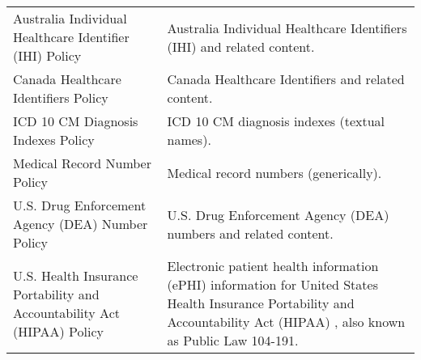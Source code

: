 \documentclass[letterpaper,10pt,english]{sphinxmanual}
\begin{document}


\begin{savenotes}\sphinxattablestart
\centering
\begin{tabulary}{\linewidth}[t]{|T|T|}
\hline
{}\relax &\relax \\
\hline
Australia Individual Healthcare
Identifier (IHI) Policy
&
Australia Individual Healthcare Identifiers (IHI) and
related content.
\\
\hline
Canada Healthcare Identifiers Policy
&
Canada Healthcare Identifiers and related content.
\\
\hline
ICD 10 CM Diagnosis Indexes Policy
&
ICD 10 CM diagnosis indexes (textual names).
\\
\hline
Medical Record Number Policy
&
Medical record numbers (generically).
\\
\hline
U.S. Drug Enforcement Agency (DEA)
Number Policy
&
U.S. Drug Enforcement Agency (DEA) numbers and related
content.
\\
\hline
U.S. Health Insurance Portability and
Accountability Act (HIPAA) Policy
&
Electronic patient health information (ePHI)
information for United States Health Insurance
Portability and Accountability Act (HIPAA) , also
known as Public Law 104-191.
\\
\hline
\end{tabulary}
\par
\sphinxattableend\end{savenotes}

\end{document}
